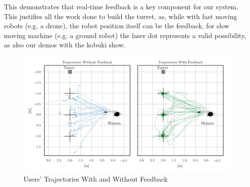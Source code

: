 This demonstrates that real-time feedback is a key component for our system. This justifies all the work done to build the turret, as, while with fast moving robots (e.g. a drone), the robot position itself can be the feedback, for slow moving machine (e.g. a ground robot) the laser dot represents a valid possibility, as also our demos with the kobuki show.

\begin{figure}
	\centering
	\includegraphics[width=\textwidth]{img/userTrajectories.png}%
	\caption{Users' Trajectories With and Without Feedback}
	\label{fig:userTrajectories}
\end{figure}




